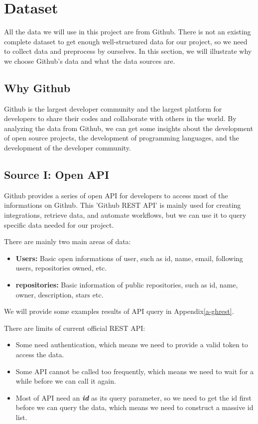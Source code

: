 \section{Dataset}

All the data we will use in this project are from Github. There is not an existing complete dataset to get enough well-structured data for our project, so we need to collect data and preprocess by ourselves. In this section, we will illustrate why we choose Github's data and what the data sources are.

\subsection{Why Github}
Github is the largest developer community and the largest platform for developers to share their codes and collaborate with others in the world. By analyzing the data from Github, we can get some insights about the development of open source projects, the development of programming languages, and the development of the developer community.



\subsection{Source I: Open API}
Github provides a series of open API for developers to access most of the informations on Github. This 'Github REST API\cite{ghapi}' is mainly used for creating integrations, retrieve data, and automate workflows, but we can use it to query specific data needed for our project.

There are mainly two main areas of data:

\begin{itemize}
    \item \textbf{Users:} Basic open informations of user, such as id, name, email, following users, repositories owned, etc.
    \item \textbf{repositories:} Basic information of public repositories, such as id, name, owner, description, stars etc.
\end{itemize}

We will provide some examples results of API query in Appendix\ref{a-ghrest}.

There are limits of current official REST API:
\begin{itemize}
    \item Some need authentication, which means we need to provide a valid token to access the data.
    \item Some API cannot be called too frequently, which means we need to wait for a while before we can call it again.
    \item Most of API need an \textbf{\textit{id}} as its query parameter, so we need to get the id first before we can query the data, which means we need to construct a massive id list.
\end{itemize}

